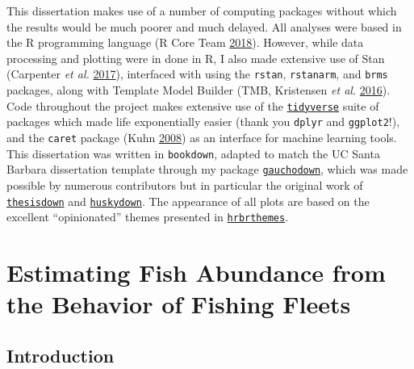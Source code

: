 \documentclass[twoside,12pt,final]{ucthesis-CA2012}
\begin{document}
\begin{ucmainmatter}
This dissertation makes use of a number of computing packages without
which the results would be much poorer and much delayed. All analyses
were based in the R programming language (R Core Team
\protect\hyperlink{ref-RCoreTeam2018}{2018}). However, while data
processing and plotting were in done in R, I also made extensive use of
Stan (Carpenter \emph{et al.}
\protect\hyperlink{ref-Carpenter2017}{2017}), interfaced with using the
\texttt{rstan}, \texttt{rstanarm}, and \texttt{brms} packages, along
with Template Model Builder (TMB, Kristensen \emph{et al.}
\protect\hyperlink{ref-Kristensen2016}{2016}). Code throughout the
project makes extensive use of the
\href{https://www.tidyverse.org/}{\texttt{tidyverse}} suite of packages
which made life exponentially easier (thank you \texttt{dplyr} and
\texttt{ggplot2}!), and the \texttt{caret} package (Kuhn
\protect\hyperlink{ref-Kuhn2008}{2008}) as an interface for machine
learning tools. This dissertation was written in \texttt{bookdown},
adapted to match the UC Santa Barbara dissertation template through my
package
\href{https://github.com/DanOvando/gauchodown}{\texttt{gauchodown}},
which was made possible by numerous contributors but in particular the
original work of
\href{https://github.com/ismayc/thesisdown}{\texttt{thesisdown}} and
\href{https://github.com/benmarwick/huskydown}{\texttt{huskydown}}. The
appearance of all plots are based on the excellent ``opinionated''
themes presented in
\href{https://github.com/hrbrmstr/hrbrthemes}{\texttt{hrbrthemes}}.

\chapter{Estimating Fish Abundance from the Behavior of Fishing
Fleets}\label{skynet}

\section{Introduction}\label{introduction-1}


\end{ucmainmatter}
\end{document}
